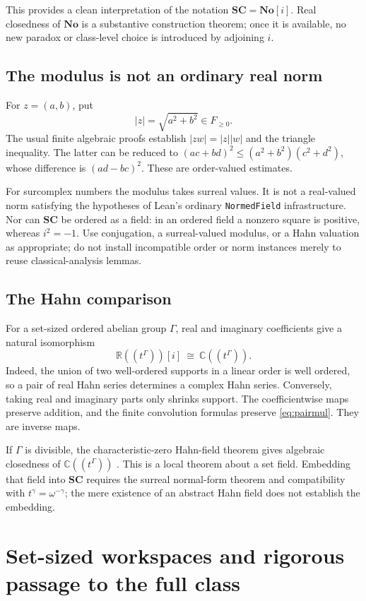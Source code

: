 \documentclass[11pt,letterpaper]{article}
\theoremstyle{definition}
\theoremstyle{remark}
\newcommand{\No}{\mathbf{No}}
\newcommand{\SC}{\mathbf{SC}}
\newcommand{\R}{\mathbb R}
\newcommand{\C}{\mathbb C}
\numberwithin{equation}{section}
\begin{document}
This provides a clean interpretation of the notation \(\SC=\No[i]\). Real closedness of \(\No\) is a substantive construction theorem; once it is available, no new paradox or class-level choice is introduced by adjoining \(i\).

\subsection{The modulus is not an ordinary real norm}
For \(z=(a,b)\), put
\[
 |z|=\sqrt{a^2+b^2}\in F_{\ge0}.
\]
The usual finite algebraic proofs establish \(|zw|=|z||w|\) and the triangle inequality. The latter can be reduced to
\((ac+bd)^2\le(a^2+b^2)(c^2+d^2)\), whose difference is \((ad-bc)^2\). These are order-valued estimates.

For surcomplex numbers the modulus takes surreal values. It is not a real-valued norm satisfying the hypotheses of Lean's ordinary \texttt{NormedField} infrastructure. Nor can \(\SC\) be ordered as a field: in an ordered field a nonzero square is positive, whereas \(i^2=-1\). Use conjugation, a surreal-valued modulus, or a Hahn valuation as appropriate; do not install incompatible order or norm instances merely to reuse classical-analysis lemmas.

\subsection{The Hahn comparison}
For a set-sized ordered abelian group \(\Gamma\), real and imaginary coefficients give a natural isomorphism
\begin{equation}\label{eq:hahncomplex}
 \R((t^\Gamma))[i]\ \cong\ \C((t^\Gamma)).
\end{equation}
Indeed, the union of two well-ordered supports in a linear order is well ordered, so a pair of real Hahn series determines a complex Hahn series. Conversely, taking real and imaginary parts only shrinks support. The coefficientwise maps preserve addition, and the finite convolution formulas preserve \eqref{eq:pairmul}. They are inverse maps.

If \(\Gamma\) is divisible, the characteristic-zero Hahn-field theorem gives algebraic closedness of \(\C((t^\Gamma))\) \cite{Poonen}. This is a local theorem about a set field. Embedding that field into \(\SC\) requires the surreal normal-form theorem and compatibility with \(t^\gamma=\omega^{-\gamma}\); the mere existence of an abstract Hahn field does not establish the embedding.

\section{Set-sized workspaces and rigorous passage to the full class}\label{sec:localization}
\end{document}
